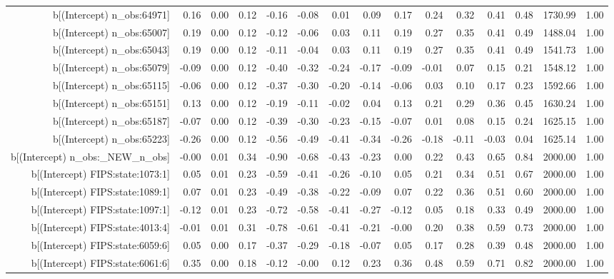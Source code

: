 \begin{table}[ht]
\begin{tabular}{rrrrrrrrrrrrrrr}
  b[(Intercept) n\_obs:64971] & 0.16 & 0.00 & 0.12 & -0.16 & -0.08 & 0.01 & 0.09 & 0.17 & 0.24 & 0.32 & 0.41 & 0.48 & 1730.99 & 1.00 \\ 
  b[(Intercept) n\_obs:65007] & 0.19 & 0.00 & 0.12 & -0.12 & -0.06 & 0.03 & 0.11 & 0.19 & 0.27 & 0.35 & 0.41 & 0.49 & 1488.04 & 1.00 \\ 
  b[(Intercept) n\_obs:65043] & 0.19 & 0.00 & 0.12 & -0.11 & -0.04 & 0.03 & 0.11 & 0.19 & 0.27 & 0.35 & 0.41 & 0.49 & 1541.73 & 1.00 \\ 
  b[(Intercept) n\_obs:65079] & -0.09 & 0.00 & 0.12 & -0.40 & -0.32 & -0.24 & -0.17 & -0.09 & -0.01 & 0.07 & 0.15 & 0.21 & 1548.12 & 1.00 \\ 
  b[(Intercept) n\_obs:65115] & -0.06 & 0.00 & 0.12 & -0.37 & -0.30 & -0.20 & -0.14 & -0.06 & 0.03 & 0.10 & 0.17 & 0.23 & 1592.66 & 1.00 \\ 
  b[(Intercept) n\_obs:65151] & 0.13 & 0.00 & 0.12 & -0.19 & -0.11 & -0.02 & 0.04 & 0.13 & 0.21 & 0.29 & 0.36 & 0.45 & 1630.24 & 1.00 \\ 
  b[(Intercept) n\_obs:65187] & -0.07 & 0.00 & 0.12 & -0.39 & -0.30 & -0.23 & -0.15 & -0.07 & 0.01 & 0.08 & 0.15 & 0.24 & 1625.15 & 1.00 \\ 
  b[(Intercept) n\_obs:65223] & -0.26 & 0.00 & 0.12 & -0.56 & -0.49 & -0.41 & -0.34 & -0.26 & -0.18 & -0.11 & -0.03 & 0.04 & 1625.14 & 1.00 \\ 
  b[(Intercept) n\_obs:\_NEW\_n\_obs] & -0.00 & 0.01 & 0.34 & -0.90 & -0.68 & -0.43 & -0.23 & 0.00 & 0.22 & 0.43 & 0.65 & 0.84 & 2000.00 & 1.00 \\ 
  b[(Intercept) FIPS:state:1073:1] & 0.05 & 0.01 & 0.23 & -0.59 & -0.41 & -0.26 & -0.10 & 0.05 & 0.21 & 0.34 & 0.51 & 0.67 & 2000.00 & 1.00 \\ 
  b[(Intercept) FIPS:state:1089:1] & 0.07 & 0.01 & 0.23 & -0.49 & -0.38 & -0.22 & -0.09 & 0.07 & 0.22 & 0.36 & 0.51 & 0.60 & 2000.00 & 1.00 \\ 
  b[(Intercept) FIPS:state:1097:1] & -0.12 & 0.01 & 0.23 & -0.72 & -0.58 & -0.41 & -0.27 & -0.12 & 0.05 & 0.18 & 0.33 & 0.49 & 2000.00 & 1.00 \\ 
  b[(Intercept) FIPS:state:4013:4] & -0.01 & 0.01 & 0.31 & -0.78 & -0.61 & -0.41 & -0.21 & -0.00 & 0.20 & 0.38 & 0.59 & 0.73 & 2000.00 & 1.00 \\ 
  b[(Intercept) FIPS:state:6059:6] & 0.05 & 0.00 & 0.17 & -0.37 & -0.29 & -0.18 & -0.07 & 0.05 & 0.17 & 0.28 & 0.39 & 0.48 & 2000.00 & 1.00 \\ 
  b[(Intercept) FIPS:state:6061:6] & 0.35 & 0.00 & 0.18 & -0.12 & -0.00 & 0.12 & 0.23 & 0.36 & 0.48 & 0.59 & 0.71 & 0.82 & 2000.00 & 1.00 \\ 

\end{tabular}
\end{table}
